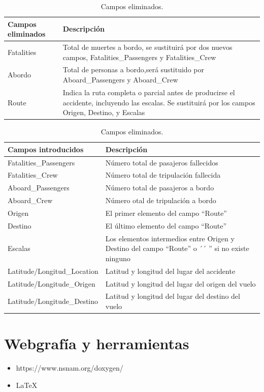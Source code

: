 \documentclass[a4paper,10pt]{article}
\begin{document}
\singlespacing
\begin{table}[htbp]
\centering
\begin{tabular}{p{3cm} p{7cm}}
\hline \hline
Campos eliminados& Descripci\'on\\
\hline \hline
Fatalities &Total de muertes a bordo, se sustituir\'a por dos nuevos campos, Fatalities\_Passengers y Fatalities\_Crew\\
\hline
Abordo&Total de personas a bordo,ser\'a sustituido por Aboard\_Passengers y Aboard\_Crew\\
\hline
Route & Indica la ruta completa o parcial antes de producirse el accidente, incluyendo las escalas. Se sustituir\'a por los campos Origen, Destino, y Escalas\\
\hline \hline
\end{tabular}
\caption{Campos eliminados.}
\label{tabla:autores}
\end{table}
\pagebreak
\begin{table}[htbp]
\centering
\begin{tabular}{p{5cm} p{5cm}}
\hline \hline
Campos introducidos &Descripci\'on\\
\hline \hline
\hline
Fatalities\_Passengers &N\'umero total de pasajeros fallecidos\\
\hline
Fatalities\_Crew&N\'umero total de tripulaci\'on fallecida\\
\hline
Aboard\_Passengers & N\'umero total de pasajeros a bordo\\
\hline
Aboard\_Crew &N\'umero otal de tripulaci\'on a bordo\\
\hline
Origen&El primer elemento del campo ``Route''\\
\hline
Destino& El \'ultimo elemento del campo ``Route''\\
\hline
Escalas & Los elementos intermedios entre Origen y Destino del campo ``Route'' o ´´ '' si no existe ninguno\\
\hline
Latitude/Longitud\_Location & Latitud  y longitud del lugar del accidente\\
\hline
Latitude/Longitude\_Origen&Latitud  y longitud del lugar del origen del vuelo\\
\hline
Latitude/Longitude\_Destino&Latitud  y longitud del lugar del destino del vuelo\\
\hline \hline
\end{tabular}
\caption{Campos eliminados.}
\label{tabla:autores}
\end{table}



\section{Webgraf\'ia y herramientas}
\begin{itemize}
\item https://www.nsnam.org/doxygen/
\item \LaTeX
\end{itemize}
\end{document}
